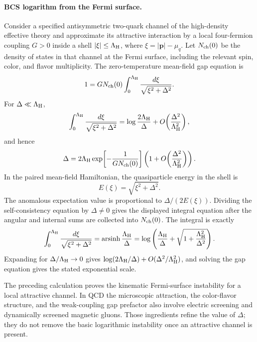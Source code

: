 \paragraph{BCS logarithm from the Fermi surface.}
Consider a specified antisymmetric two-quark channel of the high-density
effective theory and approximate its attractive interaction by a local
four-fermion coupling \(G>0\) inside a shell
\(|\xi|\le\Lambda_{\rm H}\), where
\(\xi=|\mathbf p|-\mu_q\).  Let \(N_{\rm ch}(0)\) be the density of states
in that channel at the Fermi surface, including the relevant spin, color,
and flavor multiplicity.  The zero-temperature mean-field gap equation is
\[
  1
  =
  G N_{\rm ch}(0)
  \int_0^{\Lambda_{\rm H}}
  \frac{d\xi}{\sqrt{\xi^2+\Delta^2}} .
\]
For \(\Delta\ll\Lambda_{\rm H}\),
\[
  \int_0^{\Lambda_{\rm H}}
  \frac{d\xi}{\sqrt{\xi^2+\Delta^2}}
  =
  \log\frac{2\Lambda_{\rm H}}{\Delta}
  +O\!\left(\frac{\Delta^2}{\Lambda_{\rm H}^2}\right),
\]
and hence
\[
  \Delta
  =
  2\Lambda_{\rm H}
  \exp\!\left[-\frac{1}{G N_{\rm ch}(0)}\right]
  \left(1+O\!\left(\frac{\Delta^2}{\Lambda_{\rm H}^2}\right)\right).
\]
In the paired mean-field Hamiltonian, the quasiparticle energy in the shell
is
\[
  E(\xi)=\sqrt{\xi^2+\Delta^2}.
\]
The anomalous expectation value is proportional to
\(\Delta/(2E(\xi))\).  Dividing the self-consistency equation by
\(\Delta\ne0\) gives the displayed integral equation after the angular and
internal sums are collected into \(N_{\rm ch}(0)\).  The integral is exactly
\[
  \int_0^{\Lambda_{\rm H}}\frac{d\xi}{\sqrt{\xi^2+\Delta^2}}
  =
  \operatorname{arsinh}\frac{\Lambda_{\rm H}}{\Delta}
  =
  \log\left(
    \frac{\Lambda_{\rm H}}{\Delta}
    +
    \sqrt{1+\frac{\Lambda_{\rm H}^2}{\Delta^2}}
  \right).
\]
Expanding for \(\Delta/\Lambda_{\rm H}\to0\) gives
\(\log(2\Lambda_{\rm H}/\Delta)+O(\Delta^2/\Lambda_{\rm H}^2)\), and solving
the gap equation gives the stated exponential scale.

\begin{remark}
\label{rem:qcd-bcs-logarithm-status}
The preceding calculation proves the kinematic Fermi-surface
instability for a local attractive channel.  In QCD the microscopic
attraction, the color-flavor structure, and the weak-coupling gap prefactor
also involve electric screening and dynamically screened magnetic gluons.
Those ingredients refine the value of \(\Delta\); they do not remove the
basic logarithmic instability once an attractive channel is present.
\end{remark}

